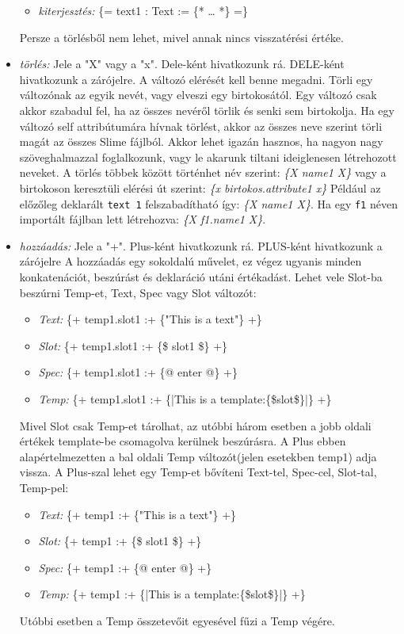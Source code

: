 \begin{itemize}
\begin{itemize}
\item\emph{kiterjesztés:} \{= text1 : Text := \{* … *\} =\}
\end{itemize}
Persze a törlésből nem lehet, mivel annak nincs visszatérési értéke.
\item \emph{törlés:} 
Jele a "X" vagy a "x".
Dele-ként hivatkozunk rá.
DELE-ként hivatkozunk a zárójelre.
A változó elérését kell benne megadni.
Törli egy változónak az egyik nevét, vagy elveszi egy birtokosától.
Egy változó csak akkor szabadul fel, ha az összes nevéről törlik és senki sem birtokolja.
Ha egy változó self attribútumára hívnak törlést, akkor az összes neve szerint törli magát az összes Slime fájlból.
Akkor lehet igazán hasznos, ha nagyon nagy szöveghalmazzal foglalkozunk, vagy le akarunk tiltani ideiglenesen létrehozott neveket.
A törlés többek között történhet név szerint: \textit{\{X name1 X\}} vagy a birtokoson keresztüli elérési út szerint: \textit{\{x birtokos.attribute1 x\}} 
Például az előzőleg deklarált \texttt{text 1} felszabadítható így: \textit{\{X name1 X\}}.
Ha egy \texttt{f1} néven importált fájlban lett létrehozva: \textit{\{X f1.name1 X\}}.
\item \emph{hozzáadás:}
Jele a "+".
Plus-ként hivatkozunk rá.
PLUS-ként hivatkozunk a zárójelre
A hozzáadás egy sokoldalú művelet, ez végez ugyanis minden konkatenációt, beszúrást és deklaráció utáni értékadást.
Lehet vele Slot-ba beszúrni Temp-et, Text, Spec vagy Slot változót: 
\begin{itemize}
\item\emph{Text:} \{+ temp1.slot1 :+ \{"This is a text"\} +\}
\item\emph{Slot:} \{+ temp1.slot1 :+ \{\$ slot1 \$\} +\}
\item\emph{Spec:} \{+ temp1.slot1 :+ \{@ enter @\} +\}
\item\emph{Temp:} \{+ temp1.slot1 :+ \{|This is a template:\{\$slot\$\}|\} +\}
\end{itemize}
Mivel Slot csak Temp-et tárolhat, az utóbbi három esetben a jobb oldali értékek template-be csomagolva kerülnek beszúrásra. 
A Plus ebben alapértelmezetten a bal oldali Temp változót(jelen esetekben temp1) adja vissza.
A Plus-szal lehet egy Temp-et bővíteni Text-tel, Spec-cel, Slot-tal, Temp-pel:
\begin{itemize}
\item\emph{Text:} \{+ temp1 :+ \{"This is a text"\} +\}
\item\emph{Slot:} \{+ temp1 :+ \{\$ slot1 \$\} +\}
\item\emph{Spec:} \{+ temp1 :+ \{@ enter @\} +\}
\item\emph{Temp:} \{+ temp1 :+ \{|This is a template:\{\$slot\$\}|\} +\}
\end{itemize} 
Utóbbi esetben a Temp összetevőit egyesével fűzi a Temp végére. 


\end{itemize}
